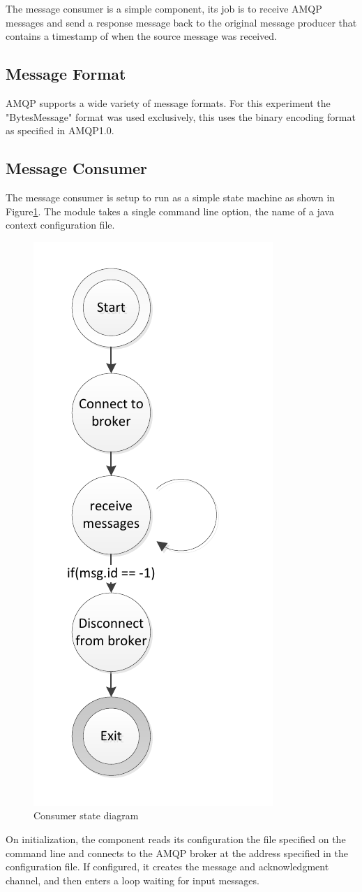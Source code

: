 \documentclass{thesis}
\begin{document}
The message consumer is a simple component, its job is to receive AMQP messages and send a response message back to the original message producer that contains a timestamp of when the source message was received.  

\subsection{Message Format}
AMQP supports a wide variety of message formats.  For this experiment the "BytesMessage" format was used exclusively, this uses the binary encoding format as specified in AMQP1.0.  
\pagebreak
\subsection{Message Consumer}
The message consumer is setup to run as a simple state machine as shown in Figure\ref{consumer-state-diagram}.  The module takes a single command line option, the name of a java context configuration file. 
\begin{figure}
\begin{center}
\vspace{-20pt}
\includegraphics[width=.25\textwidth]{consumer_state_diagram}  
\end{center}
\vspace{-20pt}
\caption{Consumer state diagram}
\label{consumer-state-diagram}
\end{figure}
On initialization, the component reads its configuration the file specified on the command line and connects to the AMQP broker at the address specified in the configuration file.  If configured, it creates the message and acknowledgment channel, and then enters a loop waiting for input messages.  
\end{document}

